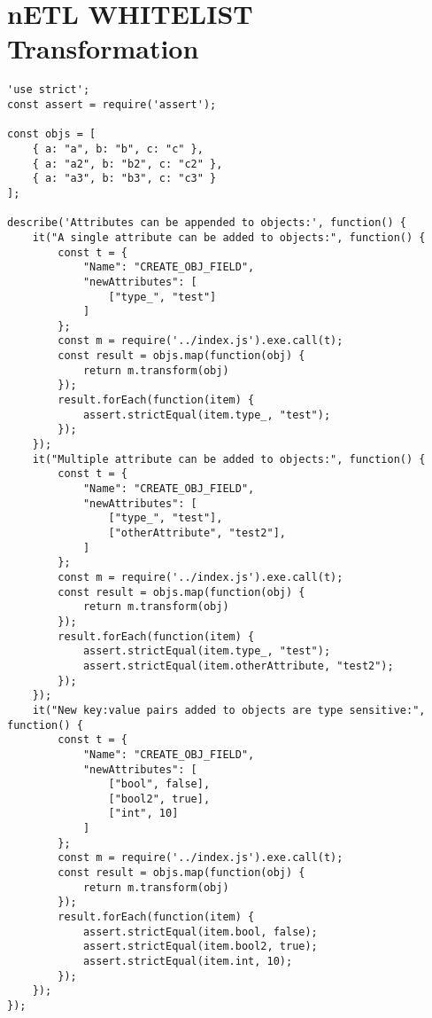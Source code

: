 \section{nETL WHITELIST Transformation}
\label{WHITELIST-tests}
\begin{verbatim}
'use strict';
const assert = require('assert');

const objs = [
    { a: "a", b: "b", c: "c" },
    { a: "a2", b: "b2", c: "c2" },
    { a: "a3", b: "b3", c: "c3" }
];

describe('Attributes can be appended to objects:', function() {
    it("A single attribute can be added to objects:", function() {
        const t = {
            "Name": "CREATE_OBJ_FIELD",
            "newAttributes": [
                ["type_", "test"]
            ]
        };
        const m = require('../index.js').exe.call(t);
        const result = objs.map(function(obj) {
            return m.transform(obj)
        });
        result.forEach(function(item) {
            assert.strictEqual(item.type_, "test");
        });
    });
    it("Multiple attribute can be added to objects:", function() {
        const t = {
            "Name": "CREATE_OBJ_FIELD",
            "newAttributes": [
                ["type_", "test"],
                ["otherAttribute", "test2"],
            ]
        };
        const m = require('../index.js').exe.call(t);
        const result = objs.map(function(obj) {
            return m.transform(obj)
        });
        result.forEach(function(item) {
            assert.strictEqual(item.type_, "test");
            assert.strictEqual(item.otherAttribute, "test2");
        });
    });
    it("New key:value pairs added to objects are type sensitive:", function() {
        const t = {
            "Name": "CREATE_OBJ_FIELD",
            "newAttributes": [
                ["bool", false],
                ["bool2", true],
                ["int", 10]
            ]
        };
        const m = require('../index.js').exe.call(t);
        const result = objs.map(function(obj) {
            return m.transform(obj)
        });
        result.forEach(function(item) {
            assert.strictEqual(item.bool, false);
            assert.strictEqual(item.bool2, true);
            assert.strictEqual(item.int, 10);
        });
    });
});
\end{verbatim}